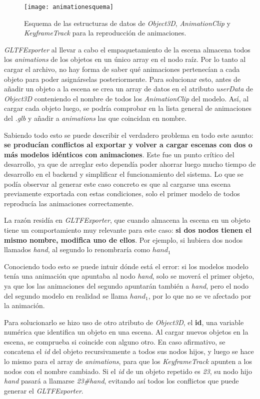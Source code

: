 \begin{figure}[h]
    \centering
    \texttt{[image: animationesquema]}
    \caption[Esquema de estructura de datos para animaciones]{Esquema de las estructuras de datos de \textit{Object3D}, \textit{AnimationClip} y \textit{KeyframeTrack} para la reproducción de animaciones.}
\end{figure}


\textit{GLTFExporter} al llevar a cabo el empaquetamiento de la escena almacena todos los \textit{animations} de los objetos en un único array en el nodo raíz. Por lo tanto al cargar el archivo, no hay forma de saber qué animaciones pertenecían a cada objeto para poder asignárselas posteriormente. Para solucionar esto, antes de añadir un objeto a la escena se crea un array de datos en el atributo \textit{userData} de \textit{Object3D} conteniendo el nombre de todos los \textit{AnimationClip} del modelo. Así, al cargar cada objeto luego, se podría comprobar en la lista general de animaciones del \textit{.glb} y añadir a \textit{animations} las que coincidan en nombre.

Sabiendo todo esto se puede describir el verdadero problema en todo este asunto: \textbf{se producían conflictos al exportar y volver a cargar escenas con dos o más modelos idénticos con animaciones}. Este fue un punto crítico del desarrollo, ya que de arreglar esto dependía poder ahorrar luego mucho tiempo de desarrollo en el backend y simplificar el funcionamiento del sistema. Lo que se podía observar al generar este caso concreto es que al cargarse una escena previamente exportada con estas condiciones, solo el primer modelo de todos reproducía las animaciones correctamente.

La razón residía en \textit{GLTFExporter}, que cuando almacena la escena en un objeto tiene un comportamiento muy relevante para este caso: \textbf{si dos nodos tienen el mismo nombre, modifica uno de ellos}. Por ejemplo, si hubiera dos nodos llamados \textit{hand}, al segundo lo renombraría como \textit{$hand_1$}

Conociendo todo esto se puede intuir dónde está el error: si los modelos modelo tenía una animación que apuntaba al nodo \textit{hand}, solo se moverá el primer objeto, ya que los las animaciones del segundo apuntarán también a \textit{hand}, pero el nodo del segundo modelo en realidad se llama \textit{$hand_1$}, por lo que no se ve afectado por la animación.

Para solucionarlo se hizo uso de otro atributo de \textit{Object3D}, el \textbf{id}, una variable numérica que identifica un objeto en una escena. Al cargar nuevos objetos en la escena, se comprueba si coincide con alguno otro. En caso afirmativo, se concatena el \textit{id} del objeto recursivamente a todos sus nodos hijos, y luego se hace lo mismo para el array de \textit{animations}, para que los \textit{KeyframeTrack} apunten a los nodos con el nombre cambiado. Si el \textit{id} de un objeto repetido es \textit{23}, su nodo hijo \textit{hand} pasará a llamarse \textit{23\#hand}, evitando así todos los conflictos que puede generar el \textit{GLTFExporter}.

